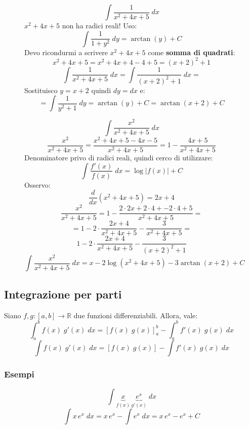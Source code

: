 \documentclass[a4paper]{article}
\theoremstyle{break}
\theoremstyle{break}
\theoremstyle{break}
\theoremstyle{break}
\begin{document}
\begin{figure}[H]
  \begin{example}
    \[
      \int \frac{1}{x^2+4x+5}\;dx
    \] 
    \( x^2 + 4x + 5 \) non ha radici reali! Uso:
    \[
      \int \frac{1}{1+y^2}\;dy = \arctan(y) + C
    \] 
    Devo ricondurmi a scrivere \( x^2+4x+5 \) come \textbf{somma di quadrati}:
    \[
      x^2+4x+5 = x^2 + 4x + 4 - 4 + 5 = (x+2)^2 + 1
    \] 
    \[
      \int \frac{1}{x^2+4x+5}\;dx = \int \frac{1}{(x+2)^2 + 1}\;dx=
    \] 
    Sostituisco \( y = x+2 \) quindi \( dy = dx \) e:
    \[
      = \int \frac{1}{y^2 + 1}\;dy = \arctan(y) + C = \arctan(x+2) + C
    \] 
  \end{example}
\end{figure}

\begin{figure}[H]
  \begin{example}
    \[
      \int \frac{x^2}{x^2+4x+5}\;dx
    \] 
    \[
      \frac{x^2}{x^2+4x+5} = \frac{x^2 + 4x + 5 - 4x - 5}{x^2+4x+5} = 1 - \frac{4x+5}{x^2+4x+5}
    \] 
    Denominatore privo di radici reali, quindi cerco di utilizzare:
    \[
      \int \frac{f'(x)}{f(x)}\;dx = \log|f(x)| + C
    \] 
    Osservo:
    \[
      \frac{d}{dx} (x^2+4x+5) = 2x + 4
    \] 
    \[
      \frac{x^2}{x^2+4x+5} = 1 - \frac{2 \cdot 2x + 2 \cdot 4 + -2 \cdot 4 + 5}{x^2+4x+5} =
    \] 
    \[
      = 1 - 2 \cdot \frac{2x+4}{x^2+4x+5} - \frac{3}{x^2+4x+5} =
    \] 
    \[
      1 - 2 \cdot \frac{2x+4}{x^2+4x+5} - \frac{3}{(x+2)^2 + 1}
    \] 
    \[
      \int \frac{x^2}{x^2+4x+5}\;dx = x - 2 \log(x^2+4x+5) - 3 \arctan(x+2) + C
    \] 
  \end{example}
\end{figure}

\subsection{Integrazione per parti}
\begin{definition}[Proposizione]
  Siano \( f,g : [a,b] \to \mathbb{R} \) due funzioni differenziabili. Allora, vale:
  \[
    \int_{a}^{b} f(x)\;g'(x)\;dx = \left[ f(x)\;g(x) \right]_{a}^{b} - \int_{a}^{b} f'(x)\;g(x)\;dx
  \] 
  \[
    \int f(x)\;g'(x)\;dx = \left[ f(x)\;g(x) \right] - \int f'(x)\;g(x)\;dx
  \] 
\end{definition}

\subsubsection{Esempi}
\begin{figure}[H]
  \begin{example}
    \[
      \int \underbrace{x}_{f(x)}\,\underbrace{e^x}_{g'(x)}\;dx
    \] 
    \[
      \int x\,e^x\;dx = x\,e^x - \int e^x\;dx = x\,e^x - e^x + C
    \] 
  \end{example}
\end{figure}
\end{document}
